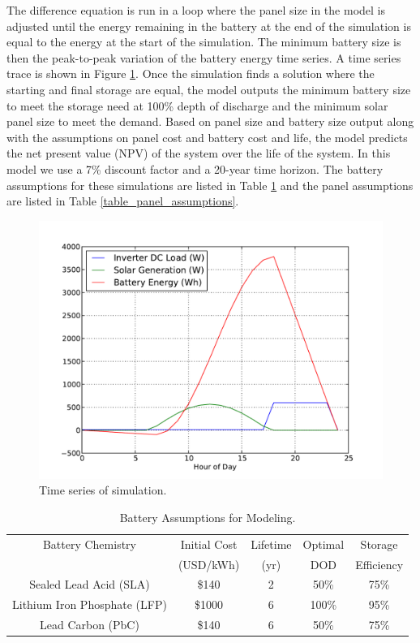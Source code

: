 \documentclass[conference]{IEEEtran}
\begin{document}
The difference equation is run in a loop where the 
panel size in the model is adjusted until the energy remaining
in the battery at the end of the simulation is equal to the
energy at the start of the simulation.
The minimum battery size is then the peak-to-peak variation
of the battery energy time series.
A time series trace is shown in Figure \ref{simulation}.
Once the simulation finds a solution where the starting and final
storage are equal, the model outputs the minimum battery size
to meet the storage need at 100\% depth of discharge and the 
minimum solar panel size to meet the demand.
Based on panel size and battery size output along with the 
assumptions on panel cost and battery cost and life, the model 
predicts the net present value (NPV) of the system over the 
life of the system.
In this model we use a 7\% discount factor and a 20-year time
horizon.
The battery assumptions for these simulations are listed in 
Table \ref{table_battery_assumptions} and the panel assumptions 
are listed in Table \ref{table_panel_assumptions}.

\begin{figure}[h]
\begin{center}
\includegraphics[trim = 0.0in 0.2in 0.0in 0.5in, clip, width=\columnwidth]{figures/simulation.pdf}
\end{center}
\caption{
Time series of simulation.
}
\label{simulation}
\end{figure}

\begin{table}
\centering
\begin{tabular}{ c c c c c }
Battery Chemistry & Initial Cost & Lifetime & Optimal & Storage \\ 
                  & (USD/kWh)    & (yr)     & DOD     & Efficiency\\
Sealed Lead Acid (SLA)       & \$140  & 2  &  50\%  & 75\%  \\
Lithium Iron Phosphate (LFP) & \$1000 & 6  & 100\%  & 95\%  \\ 
Lead Carbon (PbC)            & \$140  & 6  &  50\%  & 75\%  \\
\end{tabular}
\caption{Battery Assumptions for Modeling.}
\label{table_battery_assumptions}
\end{table}
\end{document}
